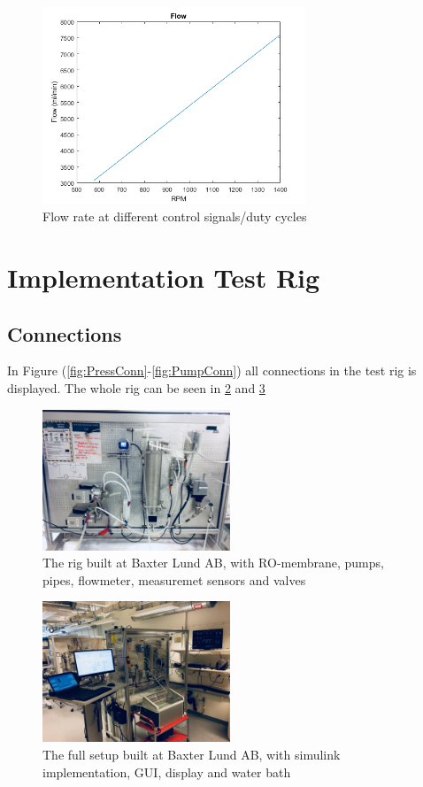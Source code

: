 \begin{figure}[h]
    \centering
    \includegraphics[width=0.7\textwidth]{Flow.png}
    \caption{Flow rate at different control signals/duty cycles}
    \label{fig:Flowrate}
\end{figure}

\section{Implementation Test Rig}


\subsection{Connections}
In Figure (\ref{fig:PressConn}-\ref{fig:PumpConn}) all connections in the test rig is displayed. The whole rig can be seen in \ref{fig:Rig1} and \ref{fig:Rig2}

\begin{figure}[h]
    \centering
    \includegraphics[width=0.5\textwidth]{Rig1}
    \caption{The rig built at Baxter Lund AB, with RO-membrane, pumps, pipes, flowmeter, measuremet sensors and valves}
    \label{fig:Rig1}
\end{figure}

\begin{figure}[h]
    \centering
    \includegraphics[width=0.5\textwidth]{Rig2}
    \caption{The full setup built at Baxter Lund AB, with simulink implementation, GUI, display and water bath}
    \label{fig:Rig2}
\end{figure}


